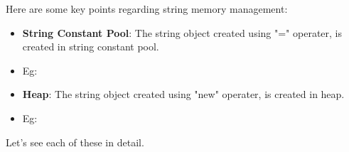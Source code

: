 \setlength{\columnsep}{3pt}
\begin{flushleft}
	Here are some key points regarding string memory management:

	\begin{itemize}
		\item \textbf{String Constant Pool}: The string object created using "=" operater, is created in string constant pool.
		\item Eg:
		\bigskip
		
		
		\item \textbf{Heap}: The string object created using "new" operater, is created in heap.
		\item Eg:
		\bigskip
		
	\end{itemize}	

	Let's see each of these in detail.
	
\end{flushleft}
